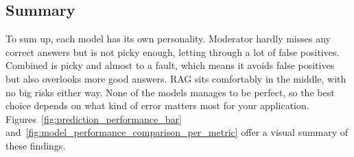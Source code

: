 \subsection{Summary}

To sum up, each model has its own personality. Moderator hardly misses any correct answers but is not picky enough, letting through a lot of false positives. Combined is picky and almost to a fault, which means it avoids false positives but also overlooks more good answers. RAG sits comfortably in the middle, with no big risks either way. None of the models manages to be perfect, so the best choice depends on what kind of error matters most for your application. Figures~\ref{fig:prediction_performance_bar} and~\ref{fig:model_performance_comparison_per_metric} offer a visual summary of these findings.


